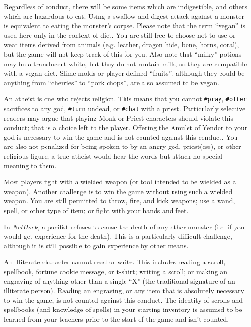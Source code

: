 Regardless of conduct, there will be some items which are indigestible,
and others which are hazardous to eat.  Using a swallow-and-digest
attack against a monster is equivalent to eating the monster's corpse.
Please note that the term ``vegan'' is used here only in the context of
diet.  You are still free to choose not to use or wear items derived
from animals (e.g. leather, dragon hide, bone, horns, coral), but the
game will not keep track of this for you.  Also note that ``milky''
potions may be a translucent white, but they do not contain milk,
so they are compatible with a vegan diet.  Slime molds or
player-defined ``fruits'', although they could be anything
from ``cherries'' to ``pork chops'', are also assumed to be vegan.

An atheist is one who rejects religion.  This means that you cannot
{\tt \#pray}, {\tt \#offer} sacrifices to any god,
{\tt \#turn} undead, or {\tt \#chat} with a priest.
Particularly selective readers may argue that playing Monk or Priest
characters should violate this conduct; that is a choice left to the
player.  Offering the Amulet of Yendor to your god is necessary to
win the game and is not counted against this conduct.  You are also
not penalized for being spoken to by an angry god, priest(ess), or
other religious figure; a true atheist would hear the words but
attach no special meaning to them.

Most players fight with a wielded weapon (or tool intended to be
wielded as a weapon).  Another challenge is to win the game without
using such a wielded weapon.  You are still permitted to throw,
fire, and kick weapons; use a wand, spell, or other type of item;
or fight with your hands and feet.

In {\it NetHack}, a pacifist refuses to cause the death of any other monster
(i.e. if you would get experience for the death).  This is a particularly
difficult challenge, although it is still possible to gain experience
by other means.

An illiterate character cannot read or write.  This includes reading
a scroll, spellbook, fortune cookie message, or t-shirt; writing a
scroll; or making an engraving of anything other than a single ``X'' (the
traditional signature of an illiterate person).  Reading an engraving,
or any item that is absolutely necessary to win the game, is not counted
against this conduct.  The identity of scrolls and spellbooks (and
knowledge of spells) in your starting inventory is assumed to be
learned from your teachers prior to the start of the game and isn't
counted.

